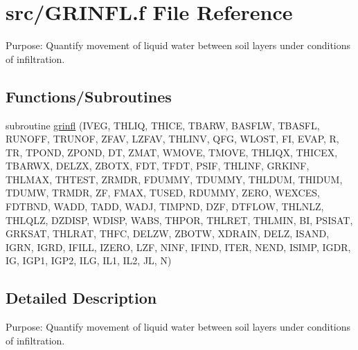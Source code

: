 \hypertarget{GRINFL_8f}{}\section{src/\+G\+R\+I\+N\+F\+L.f File Reference}
\label{GRINFL_8f}


Purpose\+: Quantify movement of liquid water between soil layers under conditions of infiltration.  


\subsection*{Functions/\+Subroutines}
\begin{DoxyCompactItemize}
\item 
subroutine \hyperlink{GRINFL_8f_aac6f2d3fad2a7b2c287fb2b821ba61f4}{grinfl} (I\+V\+E\+G, T\+H\+L\+I\+Q, T\+H\+I\+C\+E, T\+B\+A\+R\+W, B\+A\+S\+F\+L\+W, T\+B\+A\+S\+F\+L, R\+U\+N\+O\+F\+F, T\+R\+U\+N\+O\+F, Z\+F\+A\+V, L\+Z\+F\+A\+V, T\+H\+L\+I\+N\+V, Q\+F\+G, W\+L\+O\+S\+T, F\+I, E\+V\+A\+P, R, T\+R, T\+P\+O\+N\+D, Z\+P\+O\+N\+D, D\+T, Z\+M\+A\+T, W\+M\+O\+V\+E, T\+M\+O\+V\+E, T\+H\+L\+I\+Q\+X, T\+H\+I\+C\+E\+X, T\+B\+A\+R\+W\+X, D\+E\+L\+Z\+X, Z\+B\+O\+T\+X, F\+D\+T, T\+F\+D\+T, P\+S\+I\+F, T\+H\+L\+I\+N\+F, G\+R\+K\+I\+N\+F, T\+H\+L\+M\+A\+X, T\+H\+T\+E\+S\+T, Z\+R\+M\+D\+R, F\+D\+U\+M\+M\+Y, T\+D\+U\+M\+M\+Y, T\+H\+L\+D\+U\+M, T\+H\+I\+D\+U\+M, T\+D\+U\+M\+W, T\+R\+M\+D\+R, Z\+F, F\+M\+A\+X, T\+U\+S\+E\+D, R\+D\+U\+M\+M\+Y, Z\+E\+R\+O, W\+E\+X\+C\+E\+S, F\+D\+T\+B\+N\+D, W\+A\+D\+D, T\+A\+D\+D, W\+A\+D\+J, T\+I\+M\+P\+N\+D, D\+Z\+F, D\+T\+F\+L\+O\+W, T\+H\+L\+N\+L\+Z, T\+H\+L\+Q\+L\+Z, D\+Z\+D\+I\+S\+P, W\+D\+I\+S\+P, W\+A\+B\+S, T\+H\+P\+O\+R, T\+H\+L\+R\+E\+T, T\+H\+L\+M\+I\+N, B\+I, P\+S\+I\+S\+A\+T, G\+R\+K\+S\+A\+T, T\+H\+L\+R\+A\+T, T\+H\+F\+C, D\+E\+L\+Z\+W, Z\+B\+O\+T\+W, X\+D\+R\+A\+I\+N, D\+E\+L\+Z, I\+S\+A\+N\+D, I\+G\+R\+N, I\+G\+R\+D, I\+F\+I\+L\+L, I\+Z\+E\+R\+O, L\+Z\+F, N\+I\+N\+F, I\+F\+I\+N\+D, I\+T\+E\+R, N\+E\+N\+D, I\+S\+I\+M\+P, I\+G\+D\+R, I\+G, I\+G\+P1, I\+G\+P2, I\+L\+G, I\+L1, I\+L2, J\+L, N)
\end{DoxyCompactItemize}


\subsection{Detailed Description}
Purpose\+: Quantify movement of liquid water between soil layers under conditions of infiltration. 



